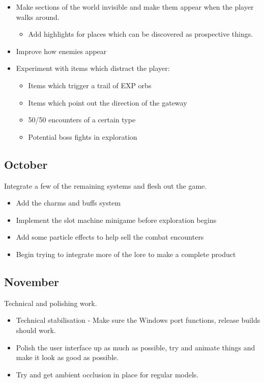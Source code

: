 \documentclass[a4paper]{scrreprt}
\begin{document}
    \begin{itemize}
        \item Make sections of the world invisible and make them appear when the player walks around.
        \begin{itemize}
            \item Add highlights for places which can be discovered as prospective things.
        \end{itemize}
        \item Improve how enemies appear
        \item Experiment with items which distract the player:
        \begin{itemize}
            \item Items which trigger a trail of EXP orbs
            \item Items which point out the direction of the gateway
            \item 50/50 encounters of a certain type
            \item Potential boss fights in exploration
        \end{itemize}
    \end{itemize}


\subsection{October}
Integrate a few of the remaining systems and flesh out the game.

    \begin{itemize}
        \item Add the charms and buffs system
        \item Implement the slot machine minigame before exploration begins
        \item Add some particle effects to help sell the combat encounters
        \item Begin trying to integrate more of the lore to make a complete product
    \end{itemize}

\subsection{November}
Technical and polishing work.

    \begin{itemize}
        \item Technical stabilisation - Make sure the Windows port functions, release builds should work.
        \item Polish the user interface up as much as possible, try and animate things and make it look as good as possible.
        \item Try and get ambient occlusion in place for regular models.
    \end{itemize}
\end{document}
